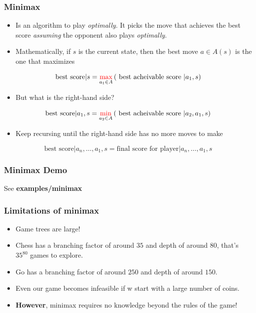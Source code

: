 \documentclass{beamer}
\begin{document}
\begin{frame}
  \frametitle{Minimax}
  \begin{itemize}
  \item Is an algorithm to play \emph{optimally}. It picks the move that achieves the best score \emph{assuming} the opponent also plays \emph{optimally}.
  \pause
  \item Mathematically, if $s$ is the current state, then the best move $a \in A(s)$ is the one that maximizes
  \end{itemize}
  \pause
  \begin{displaymath}
    \text{best score} | s = \underset{a_1 \in A}{\begingroup\color{red}\max\endgroup} \left(\text{ best acheivable score } | a_1, s\right)
  \end{displaymath}
  \pause
  \begin{itemize}
  \item But what is the right-hand side?
  \end{itemize}
  \pause
  \begin{displaymath}
    \text{best score} | a_1, s = \underset{a_2 \in A}{\begingroup\color{red}\min\endgroup} \left(\text{ best acheivable score } | a_2, a_1, s\right)
  \end{displaymath}
  \pause
  \begin{itemize}
  \item Keep recursing until the right-hand side has no more moves to make
  \end{itemize}
  \pause
  \begin{displaymath}
    \text{best score} | a_n,\dots,a_1, s = \text{final score for player} | a_n, \dots, a_1, s
  \end{displaymath}
\end{frame}

\begin{frame}
  \frametitle{Minimax Demo}
  \begin{center}
    See \textbf{examples/minimax}
  \end{center}
\end{frame}

\begin{frame}
  \frametitle{Limitations of minimax}
  \begin{itemize}
  \item Game trees are large!
    \pause
  \item Chess has a branching factor of around $35$ and depth of around $80$, that's $35^{80}$ games to explore.
    \pause
  \item Go has a branching factor of around $250$ and depth of around $150$.
    \pause
  \item Even our game becomes infeasible if w start with a large number of coins.
    \pause
  \item \textbf{However}, minimax requires no knowledge beyond the rules of the game!
  \end{itemize}
\end{frame}
\end{document}
